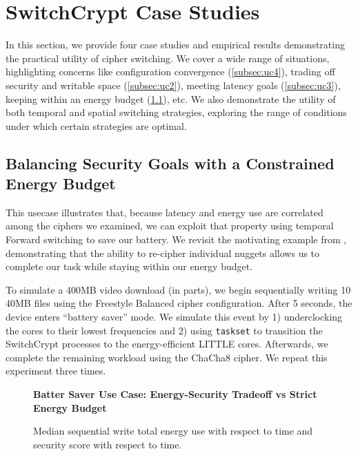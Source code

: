 \section{SwitchCrypt Case Studies}\label{sec:usecases}

In this section, we provide four case studies and empirical results
demonstrating the practical utility of cipher switching. We cover a wide range
of situations, highlighting concerns like configuration convergence
(\cref{subsec:uc4}), trading off security and writable space (\cref{subsec:uc2}),
meeting latency goals (\cref{subsec:uc3}), keeping within an energy budget
(\cref{subsec:uc1}), etc. We also demonstrate the utility of both temporal and
spatial switching strategies, exploring the range of conditions under which
certain strategies are optimal.

\subsection{Balancing Security Goals with a Constrained Energy Budget}\label{subsec:uc1}

This usecase illustrates that, because latency and energy use are correlated
among the ciphers we examined, we can exploit that property using temporal
Forward switching to save our battery. We revisit the motivating example from
, demonstrating that the ability to re-cipher individual
nuggets allows us to complete our task while staying within our energy budget.

To simulate a 400MB video download (in parts), we begin sequentially writing 10
40MB files using the Freestyle Balanced cipher configuration. After 5 seconds,
the device enters ``battery saver'' mode. We simulate this event by 1)
underclocking the cores to their lowest frequencies and 2) using
\texttt{taskset} to transition the SwitchCrypt processes to the energy-efficient
LITTLE cores. Afterwards, we complete the remaining workload using the ChaCha8
cipher. We repeat this experiment three times.

\begin{figure}[ht] \textbf{Batter Saver Use Case: Energy-Security Tradeoff vs
   Strict Energy Budget}\par\medskip
   \centering
   {} \caption{Median sequential write total
   energy use with respect to time and security score with respect to time.}
  \label{fig:usecase-battery}
\end{figure}

